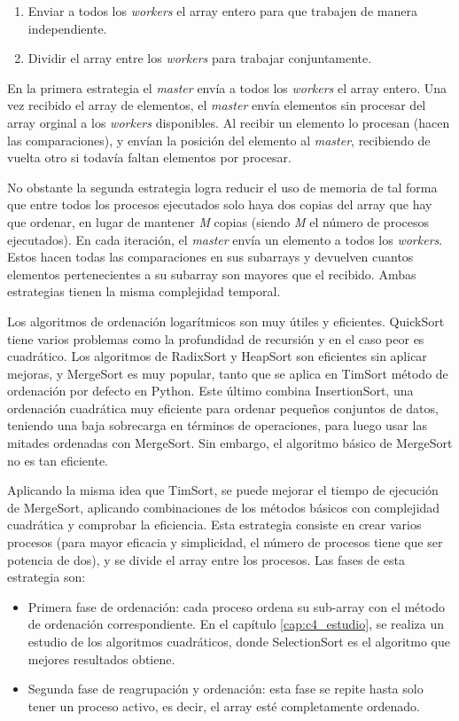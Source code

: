 	\begin{enumerate}
		\item Enviar a todos los \textit{workers} el array entero para que trabajen de manera independiente.
		\item Dividir el array entre los \textit{workers} para trabajar conjuntamente.
	\end{enumerate}
	
	En la primera estrategia el \textit{master} envía a todos los \textit{workers} el array entero. Una vez recibido el array de elementos, el \textit{master} envía elementos sin procesar del array orginal a los \textit{workers} disponibles. Al recibir un elemento lo procesan (hacen las comparaciones), y envían la posición del elemento al \textit{master}, recibiendo de vuelta otro si todavía faltan elementos por procesar. 
	
	No obstante la segunda estrategia logra reducir el uso de memoria de tal forma que entre todos los procesos ejecutados solo haya dos copias del array que hay que ordenar, en lugar de mantener \textit{M} copias (siendo \textit{M} el número de procesos ejecutados). En cada iteración, el \textit{master} envía un elemento a todos los \textit{workers}. Estos hacen todas las comparaciones en sus subarrays y devuelven cuantos elementos pertenecientes a su subarray son mayores que el recibido. Ambas estrategias tienen la misma complejidad temporal.



	Los algoritmos de ordenación logarítmicos son muy útiles y eficientes. QuickSort tiene varios problemas como la profundidad de recursión y en el caso peor es cuadrático. Los algoritmos de RadixSort y HeapSort son eficientes sin aplicar mejoras, y MergeSort es muy popular, tanto que se aplica en TimSort\cite{auger2015merge} método de ordenación por defecto en Python. Este último combina InsertionSort, una ordenación cuadrática muy eficiente para ordenar pequeños conjuntos de datos, teniendo una baja sobrecarga en términos de operaciones, para luego usar las mitades ordenadas con MergeSort. Sin embargo, el algoritmo básico de MergeSort no es tan eficiente.
	
	Aplicando la misma idea que TimSort, se puede mejorar el tiempo de ejecución de MergeSort, aplicando combinaciones de los métodos básicos con complejidad cuadrática y comprobar la eficiencia. Esta estrategia consiste en crear varios procesos (para mayor eficacia y simplicidad, el número de procesos tiene que ser potencia de dos), y se divide el array entre los procesos. Las fases de esta estrategia son:
	\begin{itemize}
		\item Primera fase de ordenación: cada proceso ordena su sub-array con el método de ordenación correspondiente. En el capítulo \ref{cap:c4_estudio}, se realiza un estudio de los algoritmos cuadráticos, donde SelectionSort es el algoritmo que mejores resultados obtiene.
		\item Segunda fase de reagrupación y ordenación: esta fase se repite hasta solo tener un proceso activo, es decir, el array esté completamente ordenado.
	\end{itemize}
	
